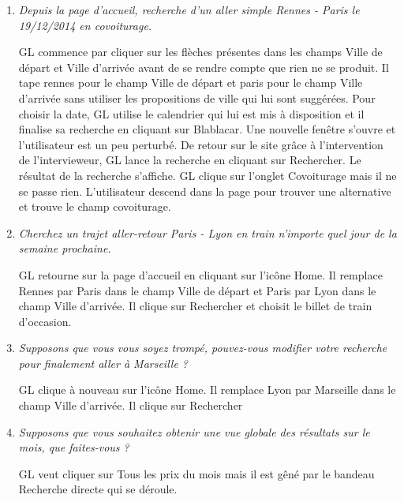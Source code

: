 \begin{enumerate}

\item \textit{Depuis la page d'accueil, recherche d'un aller simple Rennes - Paris le 19/12/2014 en covoiturage.}

GL commence par cliquer sur les fl\`{e}ches pr\'{e}sentes dans les champs \og{}Ville de d\'{e}part\fg{} et \og{}Ville d'arriv\'{e}e\fg{} avant de se rendre compte que rien ne se produit. 
Il tape \og{}rennes\fg{} pour le champ \og{}Ville de d\'{e}part\fg{} et \og{}paris\fg{} pour le champ \og{}Ville d'arriv\'{e}e\fg{} sans utiliser les propositions de ville qui lui sont sugg\'{e}r\'{e}es. 
Pour choisir la date, GL utilise le calendrier qui lui est mis \`{a} disposition et il finalise sa recherche en cliquant sur \og{}Blablacar\fg{}. 
Une nouvelle fen\^{e}tre s'ouvre et l'utilisateur est un peu perturb\'{e}. 
De retour sur le site gr\^{a}ce \`{a} l'intervention de l'intervieweur, GL lance la recherche en cliquant sur \og{}Rechercher\fg{}.
Le r\'{e}sultat de la recherche s'affiche. GL clique sur l'onglet \og{}Covoiturage\fg{} mais il ne se passe rien.
L'utilisateur descend dans la page pour trouver une alternative et trouve le champ covoiturage.
 
\item \textit{Cherchez un trajet aller-retour Paris - Lyon en train n'importe quel jour de la semaine prochaine.} 

GL retourne sur la page d'accueil en cliquant sur l'ic\^{o}ne \og{}Home\fg{}. 
Il remplace Rennes par Paris dans le champ \og{}Ville de d\'{e}part\fg{} et Paris par Lyon dans le champ \og{}Ville d'arriv\'{e}e\fg{}. 
Il clique sur \og{}Rechercher\fg{} et choisit le billet de train d'occasion.


\item \textit{Supposons que vous vous soyez tromp\'{e}, pouvez-vous modifier votre recherche pour finalement aller \`{a} Marseille ?}

GL clique \`{a} nouveau sur l'ic\^{o}ne \og{}Home\fg{}.
Il remplace Lyon par Marseille dans le champ \og{}Ville d'arriv\'{e}e\fg{}. 
Il clique sur \og{}Rechercher\fg{}


\item \textit{Supposons que vous souhaitez obtenir une vue globale des r\'{e}sultats sur le mois, que faites-vous ?}

GL veut cliquer sur \og{}Tous les prix du mois\fg{} mais il est g\^{e}n\'{e} par le bandeau \og{}Recherche directe\fg{} qui se d\'{e}roule.



\end{enumerate}
